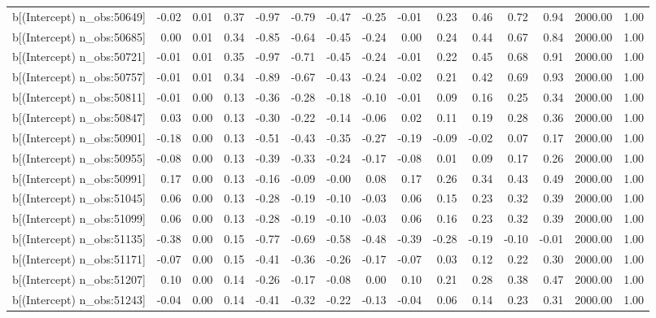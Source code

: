 \begin{table}[ht]
\begin{tabular}{rrrrrrrrrrrrrrr}
  b[(Intercept) n\_obs:50649] & -0.02 & 0.01 & 0.37 & -0.97 & -0.79 & -0.47 & -0.25 & -0.01 & 0.23 & 0.46 & 0.72 & 0.94 & 2000.00 & 1.00 \\ 
  b[(Intercept) n\_obs:50685] & 0.00 & 0.01 & 0.34 & -0.85 & -0.64 & -0.45 & -0.24 & 0.00 & 0.24 & 0.44 & 0.67 & 0.84 & 2000.00 & 1.00 \\ 
  b[(Intercept) n\_obs:50721] & -0.01 & 0.01 & 0.35 & -0.97 & -0.71 & -0.45 & -0.24 & -0.01 & 0.22 & 0.45 & 0.68 & 0.91 & 2000.00 & 1.00 \\ 
  b[(Intercept) n\_obs:50757] & -0.01 & 0.01 & 0.34 & -0.89 & -0.67 & -0.43 & -0.24 & -0.02 & 0.21 & 0.42 & 0.69 & 0.93 & 2000.00 & 1.00 \\ 
  b[(Intercept) n\_obs:50811] & -0.01 & 0.00 & 0.13 & -0.36 & -0.28 & -0.18 & -0.10 & -0.01 & 0.09 & 0.16 & 0.25 & 0.34 & 2000.00 & 1.00 \\ 
  b[(Intercept) n\_obs:50847] & 0.03 & 0.00 & 0.13 & -0.30 & -0.22 & -0.14 & -0.06 & 0.02 & 0.11 & 0.19 & 0.28 & 0.36 & 2000.00 & 1.00 \\ 
  b[(Intercept) n\_obs:50901] & -0.18 & 0.00 & 0.13 & -0.51 & -0.43 & -0.35 & -0.27 & -0.19 & -0.09 & -0.02 & 0.07 & 0.17 & 2000.00 & 1.00 \\ 
  b[(Intercept) n\_obs:50955] & -0.08 & 0.00 & 0.13 & -0.39 & -0.33 & -0.24 & -0.17 & -0.08 & 0.01 & 0.09 & 0.17 & 0.26 & 2000.00 & 1.00 \\ 
  b[(Intercept) n\_obs:50991] & 0.17 & 0.00 & 0.13 & -0.16 & -0.09 & -0.00 & 0.08 & 0.17 & 0.26 & 0.34 & 0.43 & 0.49 & 2000.00 & 1.00 \\ 
  b[(Intercept) n\_obs:51045] & 0.06 & 0.00 & 0.13 & -0.28 & -0.19 & -0.10 & -0.03 & 0.06 & 0.15 & 0.23 & 0.32 & 0.39 & 2000.00 & 1.00 \\ 
  b[(Intercept) n\_obs:51099] & 0.06 & 0.00 & 0.13 & -0.28 & -0.19 & -0.10 & -0.03 & 0.06 & 0.16 & 0.23 & 0.32 & 0.39 & 2000.00 & 1.00 \\ 
  b[(Intercept) n\_obs:51135] & -0.38 & 0.00 & 0.15 & -0.77 & -0.69 & -0.58 & -0.48 & -0.39 & -0.28 & -0.19 & -0.10 & -0.01 & 2000.00 & 1.00 \\ 
  b[(Intercept) n\_obs:51171] & -0.07 & 0.00 & 0.15 & -0.41 & -0.36 & -0.26 & -0.17 & -0.07 & 0.03 & 0.12 & 0.22 & 0.30 & 2000.00 & 1.00 \\ 
  b[(Intercept) n\_obs:51207] & 0.10 & 0.00 & 0.14 & -0.26 & -0.17 & -0.08 & 0.00 & 0.10 & 0.21 & 0.28 & 0.38 & 0.47 & 2000.00 & 1.00 \\ 
  b[(Intercept) n\_obs:51243] & -0.04 & 0.00 & 0.14 & -0.41 & -0.32 & -0.22 & -0.13 & -0.04 & 0.06 & 0.14 & 0.23 & 0.31 & 2000.00 & 1.00 \\ 

\end{tabular}
\end{table}
